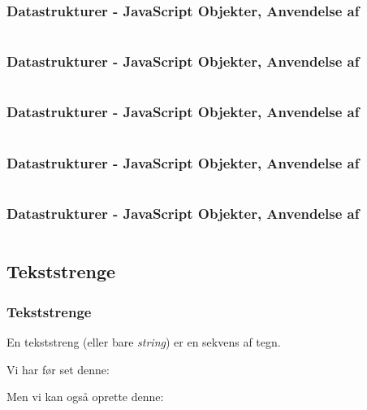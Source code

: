 \begin{frame}
    \frametitle{Datastrukturer - JavaScript Objekter, Anvendelse af}
    \vspace{-1mm}
    \inputminted[fontsize=\footnotesize]{javascript}{../src/frontend/part3_object/logic.js}
\end{frame}
\begin{frame}
    \frametitle{Datastrukturer - JavaScript Objekter, Anvendelse af}
    \vspace{-1mm}
    \inputminted[fontsize=\footnotesize,highlightlines={1}]{javascript}{../src/frontend/part3_object/logic.js}
\end{frame}
\begin{frame}
    \frametitle{Datastrukturer - JavaScript Objekter, Anvendelse af}
    \vspace{-1mm}
    \inputminted[fontsize=\footnotesize,highlightlines={4,8}]{javascript}{../src/frontend/part3_object/logic.js}
\end{frame}
\begin{frame}
    \frametitle{Datastrukturer - JavaScript Objekter, Anvendelse af}
    \vspace{-1mm}
    \inputminted[fontsize=\footnotesize,highlightlines={9}]{javascript}{../src/frontend/part3_object/logic.js}
\end{frame}
\begin{frame}
    \frametitle{Datastrukturer - JavaScript Objekter, Anvendelse af}
    \vspace{-1mm}
    \inputminted[fontsize=\footnotesize]{javascript}{../src/frontend/part3_object/logic.js}
\end{frame}

\subsection{Tekststrenge}
\begin{frame}
    \frametitle{Tekststrenge}
    \vspace{3mm}
    En tekststreng (eller bare \textsl{string}) er en sekvens af tegn.
    
    \vspace{5mm}
    Vi har før set denne:
    \vspace{-1mm}
    \begin{center}
    \end{center}
    
    Men vi kan også oprette denne:
    \vspace{-1mm}
    \begin{center}
    \end{center}
\end{frame}


